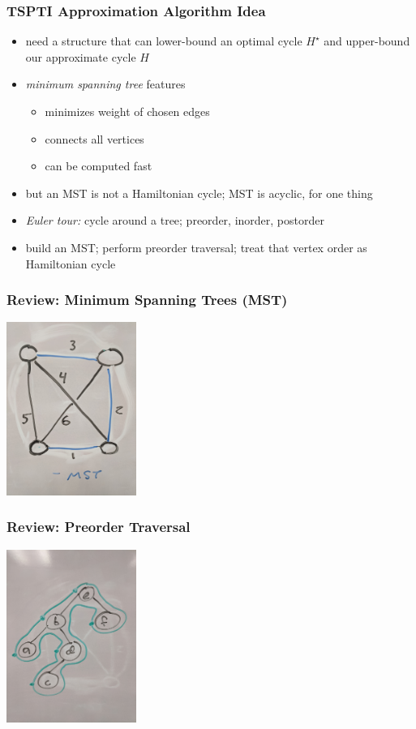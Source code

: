 \documentclass[10pt,aspectratio=169]{beamer}
\begin{document}
  \begin{frame} \frametitle{TSPTI Approximation Algorithm Idea}
  \begin{itemize}
    \item need a structure that can lower-bound an optimal cycle $H^\star$ and upper-bound
      our approximate cycle $H$
    \item \emph{minimum spanning tree} features
    \begin{itemize}
      \item minimizes weight of chosen edges
      \item connects all vertices
      \item can be computed fast
    \end{itemize}
    \item but an MST is not a Hamiltonian cycle; MST is acyclic, for one thing
    \item \emph{Euler tour:} cycle around a tree; preorder, inorder, postorder
    \item build an MST; perform preorder traversal; treat that vertex order as Hamiltonian cycle
  \end{itemize}
  \end{frame}
  
  \begin{frame} \frametitle{Review: Minimum Spanning Trees (MST)}
    \begin{center}
      \includegraphics[height=160pt]{13-mst.jpg}
    \end{center}
  \end{frame}
  
  \begin{frame} \frametitle{Review: Preorder Traversal}
    \begin{center}
      \includegraphics[height=160pt]{13-preorder.jpg}
    \end{center}
  \end{frame}
  
\end{document}
